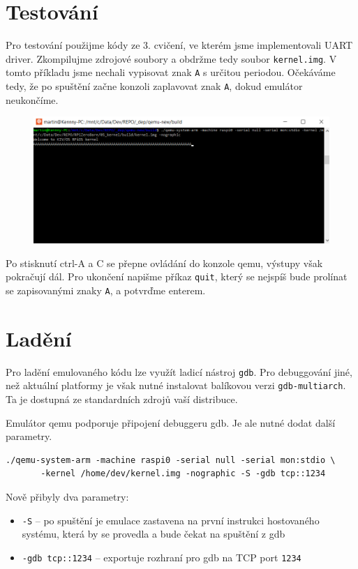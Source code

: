 \documentclass{article}
\begin{document}
\section{Testování}

Pro testování použijme kódy ze 3. cvičení, ve kterém jsme implementovali UART driver. Zkompilujme zdrojové soubory a obdržme tedy soubor {\tt kernel.img}. V tomto příkladu jsme nechali vypisovat znak {\tt A} s určitou periodou. Očekáváme tedy, že po spuštění začne konzoli zaplavovat znak {\tt A}, dokud emulátor neukončíme.

\begin{figure}[ht]
	\centering
	\includegraphics[width=\linewidth]{qemutest.png}
\end{figure}

Po stisknutí ctrl-A a C se přepne ovládání do konzole qemu, výstupy však pokračují dál. Pro ukončení napišme příkaz {\tt quit}, který se nejspíš bude prolínat se zapisovanými znaky {\tt A}, a potvrďme enterem.


\section{Ladění}

Pro ladění emulovaného kódu lze využít ladicí nástroj {\tt gdb}. Pro debuggování jiné, než aktuální platformy je však nutné instalovat balíkovou verzi {\tt gdb-multiarch}. Ta je dostupná ze standardních zdrojů vaší distribuce.

Emulátor qemu podporuje připojení debuggeru gdb. Je ale nutné dodat další parametry.

\begin{verbatim}
./qemu-system-arm -machine raspi0 -serial null -serial mon:stdio \
       -kernel /home/dev/kernel.img -nographic -S -gdb tcp::1234
\end{verbatim}

Nově přibyly dva parametry:
\begin{itemize}
	\item {\tt -S} -- po spuštění je emulace zastavena na první instrukci hostovaného systému, která by se provedla a bude čekat na spuštění z gdb
	\item {\tt -gdb tcp::1234} -- exportuje rozhraní pro gdb na TCP port {\tt 1234}
\end{itemize}
\end{document}
